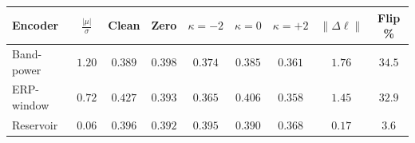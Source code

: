 \begin{tabular}{lcccccccc}
\toprule
Encoder & $\frac{|\mu|}{\sigma}$ & Clean & Zero & $\kappa{=}{-2}$ & $\kappa{=}0$ & $\kappa{=}{+2}$ & $\lVert\Delta\ell\rVert$ & Flip \% \\
\midrule
Band-power & $1.20$ & $0.389$ & $0.398$ & $0.374$ & $0.385$ & $0.361$ & $1.76$ & $34.5$ \\
ERP-window & $0.72$ & $0.427$ & $0.393$ & $0.365$ & $0.406$ & $0.358$ & $1.45$ & $32.9$ \\
Reservoir & $0.06$ & $0.396$ & $0.392$ & $0.395$ & $0.390$ & $0.368$ & $0.17$ & $3.6$ \\
\bottomrule
\end{tabular}
